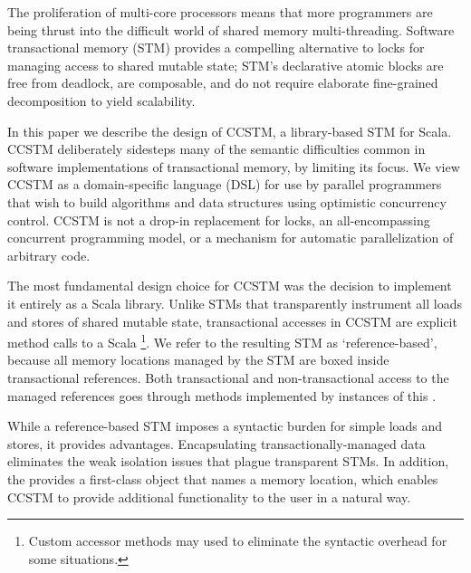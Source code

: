 The proliferation of multi-core processors means that more programmers are
being thrust into the difficult world of shared memory multi-threading.
Software transactional memory (STM) provides a compelling alternative to
locks for managing access to shared mutable state; STM's declarative
atomic blocks are free from deadlock, are composable, and do not
require elaborate fine-grained decomposition to yield scalability.


In this paper we describe the design of CCSTM, a library-based STM
for Scala.  CCSTM deliberately sidesteps many of the 
semantic difficulties common in software implementations of transactional
memory, by limiting its focus.  We view CCSTM as a domain-specific language
(DSL)
for use by parallel programmers that wish to build algorithms and data
structures using optimistic concurrency control.  CCSTM is not a drop-in replacement for
locks, an all-encompassing concurrent programming model, or a mechanism
for automatic parallelization of arbitrary code.

The most fundamental design choice for CCSTM was the decision to implement
it entirely as a Scala library.  Unlike STMs that transparently instrument
all loads and stores of shared mutable state, transactional accesses in
CCSTM are explicit method calls to a Scala \footnote{Custom
accessor methods may used to eliminate the syntactic overhead for some
situations.}.  We refer to the resulting STM as `reference-based',
because all memory locations managed by the STM are boxed inside
transactional references.  Both transactional and non-transactional
access to the managed references goes through methods implemented by
instances of this .

While a reference-based STM imposes a syntactic burden for simple loads
and stores, it provides advantages.  Encapsulating transactionally-managed
data eliminates the weak isolation issues that plague transparent STMs.
In addition, the  provides a first-class object that names a
memory location, which enables CCSTM to provide additional functionality
to the user in a natural way.

